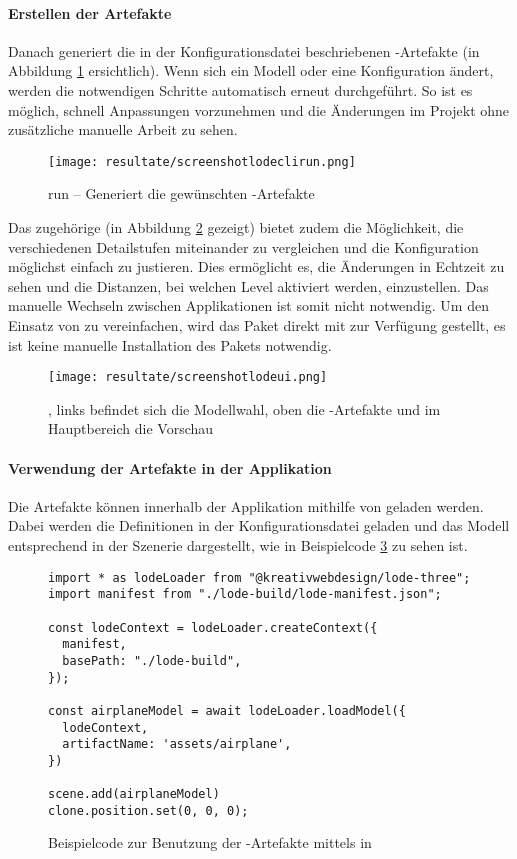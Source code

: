 \paragraph{Erstellen der Artefakte}
Danach generiert  die in der Konfigurationsdatei beschriebenen -Artefakte (in Abbildung \ref{fig:lodeclirun} ersichtlich). Wenn sich ein Modell oder eine Konfiguration ändert, werden die notwendigen Schritte automatisch erneut durchgeführt. So ist es möglich, schnell Anpassungen vorzunehmen und die Änderungen im Projekt ohne zusätzliche manuelle Arbeit zu sehen.

\begin{figure}[H]
  \centering
  \texttt{[image: resultate/screenshotlodeclirun.png]}
  \caption{ run – Generiert die gewünschten -Artefakte}
  \label{fig:lodeclirun}
\end{figure}

Das zugehörige  (in Abbildung \ref{fig:lodeui} gezeigt) bietet zudem die Möglichkeit, die verschiedenen Detailstufen miteinander zu vergleichen und die Konfiguration möglichst einfach zu justieren. Dies ermöglicht es, die Änderungen in Echtzeit zu sehen und die Distanzen, bei welchen Level aktiviert werden, einzustellen. Das manuelle Wechseln zwischen Applikationen ist somit nicht notwendig.
Um den Einsatz von  zu vereinfachen, wird das Paket direkt mit  zur Verfügung gestellt, es ist keine manuelle Installation des Pakets notwendig.

\begin{figure}[H]
  \centering
  \texttt{[image: resultate/screenshotlodeui.png]}
  \caption{, links befindet sich die Modellwahl, oben die -Artefakte und im Hauptbereich die Vorschau}
  \label{fig:lodeui}
\end{figure}

\paragraph{Verwendung der Artefakte in der Applikation}
Die Artefakte können innerhalb der Applikation mithilfe von  geladen werden. Dabei werden die Definitionen in der Konfigurationsdatei geladen und das Modell entsprechend in der Szenerie dargestellt, wie in Beispielcode \ref{code:lodeThreeUsage} zu sehen ist.

\begin{figure}[H]
  \begin{lstlisting}[style=JavaScript]
import * as lodeLoader from "@kreativwebdesign/lode-three";
import manifest from "./lode-build/lode-manifest.json";

const lodeContext = lodeLoader.createContext({
  manifest,
  basePath: "./lode-build",
});

const airplaneModel = await lodeLoader.loadModel({
  lodeContext,
  artifactName: 'assets/airplane',
})

scene.add(airplaneModel)
clone.position.set(0, 0, 0);
  \end{lstlisting}
  \caption{Beispielcode zur Benutzung der -Artefakte mittels  in }
  \label{code:lodeThreeUsage}
\end{figure}


